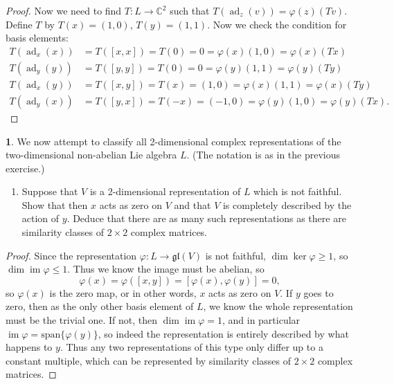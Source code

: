 \documentclass[12pt]{article}
\DeclareMathOperator{\im}{im}
\DeclareMathOperator{\ad}{ad}
\newcommand{\gl}{\mathfrak{gl}}
\theoremstyle{definition}
\newtheorem{ex}{}
\begin{document}
\begin{proof}
    Now we need to find $T : L \to \mathbb{C}^2$ such that $T(\ad_z(v)) = \varphi(z)(Tv)$.
    Define $T$ by $T(x) = (1, 0)$, $T(y) = (1, 1)$.
    Now we check the condition for basis elements: \begin{align*}
      T(\ad_x(x)) & = T([x, x]) = T(0) = 0 = \varphi(x)(1, 0) = \varphi(x)(Tx) \\
      T(\ad_y(y)) & = T([y, y]) = T(0) = 0 = \varphi(y)(1, 1) = \varphi(y)(Ty) \\
      T(\ad_x(y)) & = T([x, y]) = T(x) = (1, 0) = \varphi(x)(1, 1) = \varphi(x)(Ty) \\
      T(\ad_y(x)) & = T([y, x]) = T(-x) = (-1, 0) = \varphi(y)(1, 0) = \varphi(y)(Tx).
    \end{align*}
\end{proof}

\begin{ex}
	We now attempt to classify all 2-dimensional complex representations of the two-dimensional non-abelian Lie algebra $L$.
	(The notation is as in the previous exercise.)
	\begin{enumerate}[label=(\roman*)]
		\item Suppose that $V$ is a 2-dimensional representation of $L$ which is not faithful.
		      Show that then $x$ acts as zero on $V$ and that $V$ is completely described by the action of $y$.
		      Deduce that there are as many such representations as there are similarity classes of $2 \times 2$ complex matrices.
	\end{enumerate}
\end{ex}
\begin{proof}
  Since the representation $\varphi: L \to \gl(V)$ is not faithful, $\dim\ker\varphi \geq 1$, so $\dim\im\varphi \leq 1$.
  Thus we know the image must be abelian, so \begin{equation*}
    \varphi(x) = \varphi([x, y]) = [\varphi(x), \varphi(y)] = 0,
  \end{equation*}
  so $\varphi(x)$ is the zero map, or in other words, $x$ acts as zero on $V$.
  If $y$ goes to zero, then as the only other basis element of $L$, we know the whole representation must be the trivial one.
  If not, then $\dim\im\varphi = 1$, and in particular $\im\varphi = \mathrm{span}\lbrace \varphi(y) \rbrace$, so indeed the representation is entirely described by what happens to $y$.
  Thus any two representations of this type only differ up to a constant multiple, which can be represented by similarity classes of $2 \times 2$ complex matrices.
\end{proof}
\end{document}
